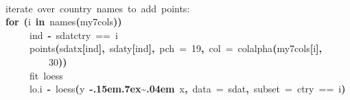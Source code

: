 \documentclass[a4paper]{article}
\newcommand{\hlnumber}[1]{\textcolor[rgb]{0.0823529411764706,0.0784313725490196,0.709803921568627}{#1}}%
\newcommand{\hlfunctioncall}[1]{\textcolor[rgb]{1,0,0}{#1}}%
\newcommand{\hlkeyword}[1]{\textcolor[rgb]{0,0,0}{\textbf{#1}}}%
\newcommand{\hlargument}[1]{\textcolor[rgb]{0.694117647058824,0.247058823529412,0.0196078431372549}{#1}}%
\newcommand{\hlcomment}[1]{\textcolor[rgb]{0.8,0.8,0.8}{#1}}%
\newcommand{\hlassignement}[1]{\textcolor[rgb]{0.215686274509804,0.215686274509804,0.384313725490196}{\textbf{#1}}}%
\newcommand{\hlsymbol}[1]{\textcolor[rgb]{0,0,0}{#1}}%
\newcommand{\hlprompt}[1]{\textcolor[rgb]{0,0,0}{#1}}%
\def\urltilda{\kern -.15em\lower .7ex\hbox{\~{}}\kern .04em}%
\newcommand{\hlstd}[1]{\textcolor[rgb]{0,0,0}{#1}}%
\newenvironment{Houtput}{\raggedright}{%
%
}
\begin{document}
\begin{Houtput}
\hspace*{\fill}\\
\hlstd{}\ttfamily\noindent
\hlprompt{\usebox{\hlnormalsizeboxgreaterthan}{\ }}\hlcomment{\usebox{\hlnormalsizeboxhash}{\ }iterate{\ }over{\ }country{\ }names{\ }to{\ }add{\ }points:}\mbox{}
\normalfont
\hspace*{\fill}\\
\hlstd{}\ttfamily\noindent
\hlprompt{\usebox{\hlnormalsizeboxgreaterthan}{\ }}\hlkeyword{for}{\ }\hlkeyword{(}\hlsymbol{i}{\ }\hlkeyword{in}{\ }\hlfunctioncall{names}\hlkeyword{(}\hlsymbol{my7cols}\hlkeyword{)}\hlkeyword{)}{\ }\hlkeyword{\usebox{\hlnormalsizeboxopenbrace}}\hspace*{\fill}\\
\hlstd{}\hlprompt{{\ }}{\ }{\ }{\ }{\ }\hlsymbol{ind}{\ }\hlassignement{\usebox{\hlnormalsizeboxlessthan}-}{\ }\hlsymbol{sdat}\hlkeyword{\usebox{\hlnormalsizeboxdollar}}\hlsymbol{ctry}{\ }=={\ }\hlsymbol{i}\hspace*{\fill}\\
\hlstd{}\hlprompt{{\ }}{\ }{\ }{\ }{\ }\hlfunctioncall{points}\hlkeyword{(}\hlsymbol{sdat}\hlkeyword{\usebox{\hlnormalsizeboxdollar}}\hlsymbol{x}\hlkeyword{[}\hlsymbol{ind}\hlkeyword{]}\hlkeyword{,}{\ }\hlsymbol{sdat}\hlkeyword{\usebox{\hlnormalsizeboxdollar}}\hlsymbol{y}\hlkeyword{[}\hlsymbol{ind}\hlkeyword{]}\hlkeyword{,}{\ }\hlargument{pch}{\ }\hlargument{=}{\ }\hlnumber{19}\hlkeyword{,}{\ }\hlargument{col}{\ }\hlargument{=}{\ }\hlfunctioncall{colalpha}\hlkeyword{(}\hlsymbol{my7cols}\hlkeyword{[}\hlsymbol{i}\hlkeyword{]}\hlkeyword{,}\hspace*{\fill}\\
\hlstd{}\hlprompt{{\ }}{\ }{\ }{\ }{\ }{\ }{\ }{\ }{\ }\hlnumber{30}\hlkeyword{)}\hlkeyword{)}\hspace*{\fill}\\
\hlstd{}\hlprompt{{\ }}{\ }{\ }{\ }{\ }\hlcomment{\usebox{\hlnormalsizeboxhash}{\ }fit{\ }loess}\hspace*{\fill}\\
\hlstd{}\hlprompt{{\ }}{\ }{\ }{\ }{\ }\hlsymbol{lo.i}{\ }\hlassignement{\usebox{\hlnormalsizeboxlessthan}-}{\ }\hlfunctioncall{loess}\hlkeyword{(}\hlsymbol{y}{\ }\hlkeyword{\urltilda{}}{\ }\hlsymbol{x}\hlkeyword{,}{\ }\hlargument{data}{\ }\hlargument{=}{\ }\hlsymbol{sdat}\hlkeyword{,}{\ }\hlargument{subset}{\ }\hlargument{=}{\ }\hlsymbol{ctry}{\ }=={\ }\hlsymbol{i}\hlkeyword{)}\hspace*{\fill}\\

\end{Houtput}
\end{document}
